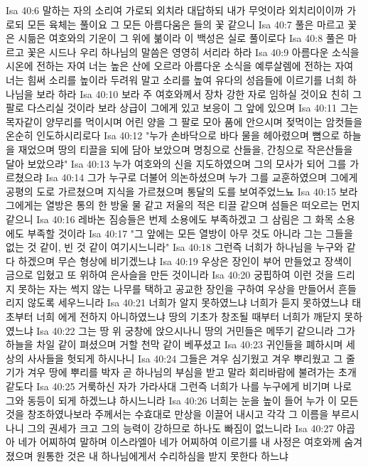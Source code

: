 Isa 40:6  말하는 자의 소리여 가로되 외치라 대답하되 내가 무엇이라 외치리이이까 가로되 모든 육체는 풀이요 그 모든 아름다움은 들의 꽃 같으니
Isa 40:7  풀은 마르고 꽃은 시듦은 여호와의 기운이 그 위에 붊이라 이 백성은 실로 풀이로다
Isa 40:8  풀은 마르고 꽃은 시드나 우리 하나님의 말씀은 영영히 서리라 하라
Isa 40:9  아름다운 소식을 시온에 전하는 자여 너는 높은 산에 오르라 아름다운 소식을 예루살렘에 전하는 자여 너는 힘써 소리를 높이라 두려워 말고 소리를 높여 유다의 성읍들에 이르기를 너희 하나님을 보라 하라
Isa 40:10  보라 주 여호와께서 장차 강한 자로 임하실 것이요 친히 그 팔로 다스리실 것이라 보라 상급이 그에게 있고 보응이 그 앞에 있으며
Isa 40:11  그는 목자같이 양무리를 먹이시며 어린 양을 그 팔로 모아 품에 안으시며 젖먹이는 암컷들을 온순히 인도하시리로다
Isa 40:12  "누가 손바닥으로 바다 물을 헤아렸으며 뼘으로 하늘을 재었으며 땅의 티끌을 되에 담아 보았으며 명칭으로 산들을, 간칭으로 작은산들을 달아 보았으랴"
Isa 40:13  누가 여호와의 신을 지도하였으며 그의 모사가 되어 그를 가르쳤으랴
Isa 40:14  그가 누구로 더불어 의논하셨으며 누가 그를 교훈하였으며 그에게 공평의 도로 가르쳤으며 지식을 가르쳤으며 통달의 도를 보여주었느뇨
Isa 40:15  보라 그에게는 열방은 통의 한 방울 물 같고 저울의 적은 티끌 같으며 섬들은 떠오르는 먼지 같으니
Isa 40:16  레바논 짐승들은 번제 소용에도 부족하겠고 그 삼림은 그 화목 소용에도 부족할 것이라
Isa 40:17  "그 앞에는 모든 열방이 아무 것도 아니라 그는 그들을 없는 것 같이, 빈 것 같이 여기시느니라"
Isa 40:18  그런즉 너희가 하나님을 누구와 같다 하겠으며 무슨 형상에 비기겠느냐
Isa 40:19  우상은 장인이 부어 만들었고 장색이 금으로 입혔고 또 위하여 은사슬을 만든 것이니라
Isa 40:20  궁핍하여 이런 것을 드리지 못하는 자는 썩지 않는 나무를 택하고 공교한 장인을 구하여 우상을 만들어서 흔들리지 않도록 세우느니라
Isa 40:21  너희가 알지 못하였느냐 너희가 듣지 못하였느냐 태초부터 너희 에게 전하지 아니하였느냐 땅의 기초가 창조될 때부터 너희가 깨닫지 못하였느냐
Isa 40:22  그는 땅 위 궁창에 앉으시나니 땅의 거민들은 메뚜기 같으니라 그가 하늘을 차일 같이 펴셨으며 거할 천막 같이 베푸셨고
Isa 40:23  귀인들을 폐하시며 세상의 사사들을 헛되게 하시나니
Isa 40:24  그들은 겨우 심기웠고 겨우 뿌리웠고 그 줄기가 겨우 땅에 뿌리를 박자 곧 하나님의 부심을 받고 말라 회리바람에 불려가는 초개 같도다
Isa 40:25  거룩하신 자가 가라사대 그런즉 너희가 나를 누구에게 비기며 나로 그와 동등이 되게 하겠느냐 하시느니라
Isa 40:26  너희는 눈을 높이 들어 누가 이 모든 것을 창조하였나보라 주께서는 수효대로 만상을 이끌어 내시고 각각 그 이름을 부르시나니 그의 권세가 크고 그의 능력이 강하므로 하나도 빠짐이 없느니라
Isa 40:27  야곱아 네가 어찌하여 말하며 이스라엘아 네가 어찌하여 이르기를 내 사정은 여호와께 숨겨졌으며 원통한 것은 내 하나님에게서 수리하심을 받지 못한다 하느냐
